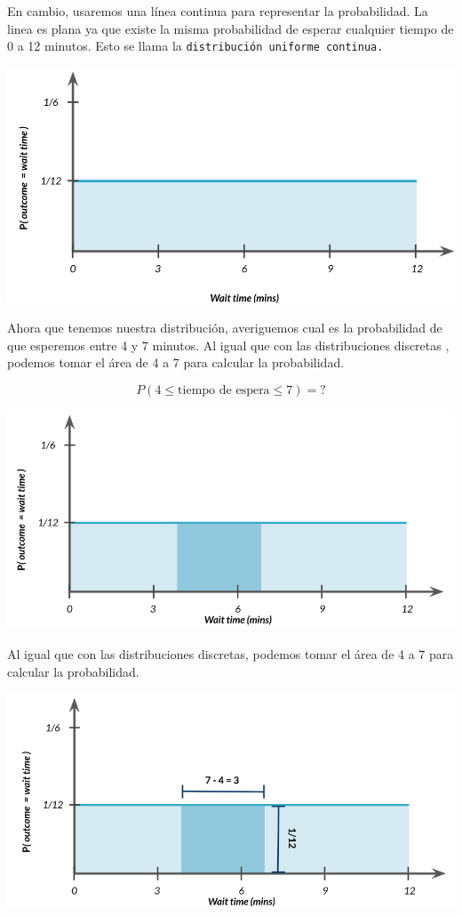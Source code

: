 \documentclass[
  letterpaper,
  DIV=11,
  numbers=noendperiod]{scrreprt}
\begin{document}
En cambio, usaremos una línea continua para representar la probabilidad.
La linea es plana ya que existe la misma probabilidad de esperar
cualquier tiempo de 0 a 12 minutos. Esto se llama la
\texttt{distribución\ uniforme\ continua.}

\includegraphics{fig30.png}

Ahora que tenemos nuestra distribución, averiguemos cual es la
probabilidad de que esperemos entre 4 y 7 minutos. Al igual que con las
distribuciones discretas , podemos tomar el área de 4 a 7 para calcular
la probabilidad.

\[
P(4\leq \mbox{tiempo de espera} \leq 7) = ?
\]

\includegraphics{fig31.png}

Al igual que con las distribuciones discretas, podemos tomar el área de
4 a 7 para calcular la probabilidad.

\includegraphics{fig32.png}
\end{document}
